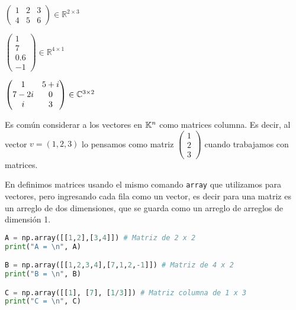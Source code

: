 \begin{ejemplo}\leavevmode\noindent
\begin{enumerate}
\begin{minipage}{0.3\linewidth}
\item   $\begin{pmatrix} 1 & 2 & 3 \\ 4 & 5 & 6 \end{pmatrix} \in \mathbb{R}^{2 \times 3}$
\end{minipage}
\begin{minipage}{0.3\linewidth}
\item   $\begin{pmatrix} 1 \\ 7 \\ 0.6 \\ -1 \end{pmatrix} \in \mathbb{R}^{4 \times 1}$
\end{minipage}
\begin{minipage}{0.4\linewidth}
\item   $\begin{pmatrix} 1 & 5 + i \\ 7 -2i & 0 \\ i & 3 \end{pmatrix} \in \mathbb C^{3 \times 2}$
\end{minipage}
\end{enumerate}
\end{ejemplo}

Es común considerar a los vectores en $\mathbb K^n$ como matrices columna. Es decir, al vector $v=(1,2,3)$ lo pensamos como matriz $\begin{pmatrix} 1 \\ 2 \\ 3\end{pmatrix}$ cuando trabajamos con matrices.

En \python definimos matrices usando el mismo comando \texttt{array} que utilizamos para vectores, pero ingresando cada fila como un vector, es decir para \python una matriz es un arreglo de dos dimensiones, que se guarda como un arreglo de arreglos de dimensión 1.

\begin{Shaded}
\begin{lstlisting}[language=python]
A = np.array([[1,2],[3,4]]) # Matriz de 2 x 2
print("A = \n", A)

B = np.array([[1,2,3,4],[7,1,2,-1]]) # Matriz de 4 x 2
print("B = \n", B)

C = np.array([[1], [7], [1/3]]) # Matriz columna de 1 x 3
print("C = \n", C)
\end{lstlisting}
\end{Shaded}

